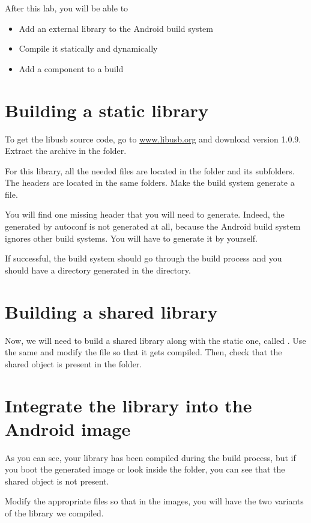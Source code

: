 
After this lab, you will be able to
\begin{itemize}
  \item Add an external library to the Android build system
  \item Compile it statically and dynamically
  \item Add a component to a build
\end{itemize}

\section{Building a static library}

To get the libusb source code, go to \url{www.libusb.org} and download
version 1.0.9. Extract the archive in the  folder.

For this library, all the needed  files are located in the 
folder and its subfolders. The headers are located in the same folders. Make
the build system generate a  file.

You will find one missing header that you will need to generate. Indeed, the
 generated by autoconf is not generated at all, because the
Android build system ignores other build systems. You will have to generate it
by yourself.

If successful, the build system should go through the build process and you
should have a directory generated in the  directory.

\section{Building a shared library}

Now, we will need to build a shared library along with the static one, called
. Use the same  and modify the 
file so that it gets compiled. Then, check that the shared object is present in
the  folder.

\section{Integrate the library into the Android image}

As you can see, your library has been compiled during the build process, but if
you boot the generated image or look inside the
folder, you can see that the shared object is not present.

Modify the appropriate files so that in the images, you will have the two 
variants of the library we compiled.

